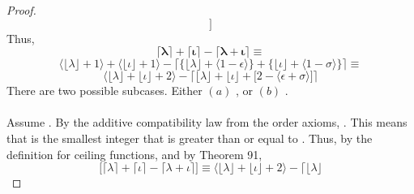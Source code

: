 \documentclass[preview]{standalone}
\begin{document}
\begin{proof}
\begin{equation*}
        \bigg]
    \end{equation*} 
    Thus, 
    \begin{equation*}
        \bm{
            \lceil \lambda \rceil 
                + 
            \lceil \iota \rceil 
                - 
            \lceil \lambda + \iota \rceil 
        }
            \equiv
    \end{equation*}
    \begin{equation*}
        \Big \langle \lfloor \lambda \rfloor + 1 \Big \rangle 
            + 
        \Big \langle \lfloor \iota \rfloor + 1 \Big \rangle
            - 
        \bigg \lceil
            \Big\{
                \lfloor \lambda \rfloor
                    + 
                \big \langle 1 - \epsilon \big \rangle
            \Big\}
                +
            \Big\{
                \lfloor \iota \rfloor 
                    + 
                \big \langle 1 - \sigma \big \rangle
            \Big\}
        \bigg \rceil
            \equiv
    \end{equation*} 
    \begin{equation*}
        \Big \langle \lfloor \lambda \rfloor + \lfloor \iota \rfloor + 2 \Big \rangle
            - 
        \bigg \lceil
            \lfloor \lambda \rfloor 
                + 
            \lfloor \iota \rfloor 
                + 
            \Big[
                2 
                    - 
                \big \langle \epsilon + \sigma \big \rangle
            \Big]
        \bigg \rceil
    \end{equation*} 
    There are two possible subcases. Either 
    $(a)$ , 
    or $(b)$ .
    \\ \\
     Assume 
    . 
    By the additive compatibility law from the order axioms, 
    . 
    This means that  is the smallest integer that is greater than or equal to 
    .
    Thus, by the definition for ceiling functions, 
    and by Theorem 91,
    \begin{equation*}
        \Big[ 
            \lceil \lambda \rceil 
                + 
            \lceil \iota \rceil 
                - 
            \lceil \lambda + \iota \rceil 
        \Big]
            \equiv
        \Big \langle \lfloor \lambda \rfloor + \lfloor \iota \rfloor + 2 \Big \rangle
            - 
        \Big \lceil
            \lfloor \lambda \rfloor 

\end{equation*}
\end{proof}
\end{document}

